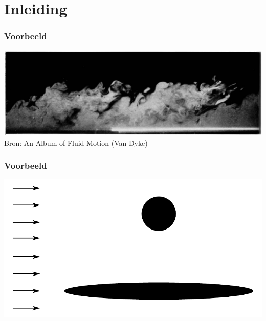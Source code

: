 \documentclass[t]{beamer}
\subtitle{Grenslagen en turbulentie}
\begin{document}
	\frame{\titlepage}
	\section{Inleiding}
	\begin{frame}
		\frametitle{Voorbeeld}
		\center
		\vspace{1cm}
    	\includegraphics[width=\textwidth]{fig/uitwendige_stroming/Turbulent_boundary_layer_Falco1977.png}\\
		\footnotesize{Bron: An Album of Fluid Motion (Van Dyke)}
  	\end{frame}
  	\begin{frame}
		\frametitle{Voorbeeld}
		\center
    	\includegraphics[width=\textwidth]{fig/uitwendige_stroming/Vormweerstand-oppervlakteweerstand}\\
  	\end{frame}
\end{document}
